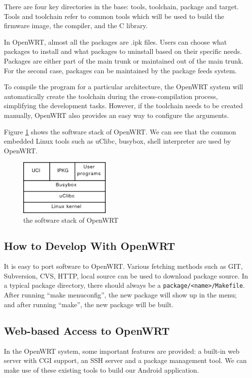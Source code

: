 \documentclass{sig-alternate-05-2015}
\begin{document}
	There are four key directories in the base: tools, toolchain, package and target.
	Tools and toolchain refer to common tools which will be used to build the firmware image, the compiler, and the C library.
	
	In OpenWRT, almost all the packages are .ipk files. Users can choose what packages to install and what packages to uninstall based on their specific needs. Packages are either part of the main trunk or maintained out of the main trunk. For the second case, packages can be maintained by the package feeds system.
	
	To compile the program for a particular architecture, the OpenWRT system will automatically create the toolchain during the cross-compilation process, simplifying the development tasks. However, if the toolchain needs to be created manually, OpenWRT also provides an easy way to configure the arguments.
	
	Figure \ref{OpenWRT:stack} shows the software stack of OpenWRT. We can see that the common embedded Linux tools such as uClibc, busybox, shell interpreter are used by OpenWRT.
	
	\begin{figure}
		\centering
		\includegraphics[width=0.4\textwidth]{stack.png}
		\caption{the software stack of OpenWRT}
		\label{OpenWRT:stack}
	\end{figure}
	
	\subsection{How to Develop With OpenWRT}
	
	It is easy to port software to OpenWRT. Various fetching methods such as GIT, Subversion, CVS, HTTP, local source can be used to download package source. In a typical package directory, there should always be a \verb|package/<name>/Makefile|. After running ``make menuconfig'', the new package will show up in the menu; and after running ``make'', the new package will be built.
	
	\subsection{Web-based Access to OpenWRT}
	In the OpenWRT system, some important features are provided: a built-in web server with CGI support, an SSH server and a package management tool. We can make use of these existing tools to build our Android application.
	
\end{document}
